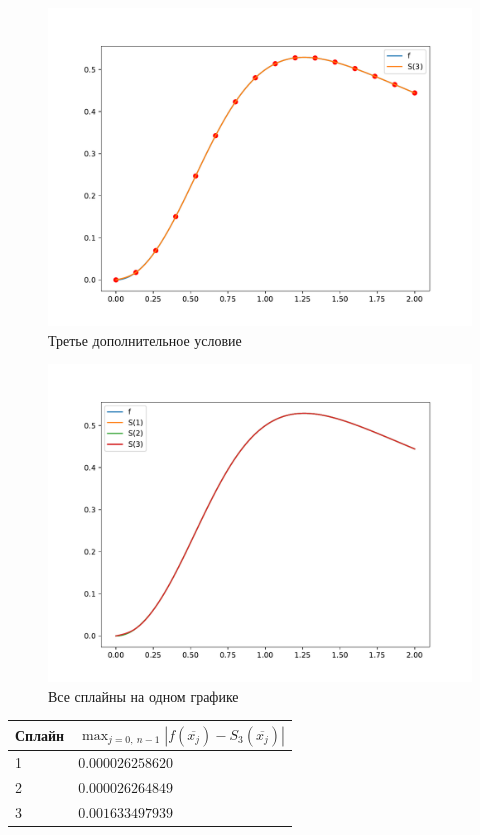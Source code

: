 \documentclass[12pt, a4paper]{article}
\begin{document}
\begin{figure}[H]
	\centering
	\includegraphics[width=\linewidth]{3.pdf}
	\caption{Третье дополнительное условие}
	\label{fig:case_3}
\end{figure}


\begin{figure}[H]
	\centering
	\includegraphics[width=\linewidth]{4.pdf}
	\caption{Все сплайны на одном графике}
	\label{fig:three_cases}
\end{figure}

\begin{table}[H]
	\centering
	\begin{tabular}{|l|l|}
	\hline
		Сплайн	& $\max_{j=0,\ n-1}|f(\overline{x_j}) - S_3(\overline{x_j})|$ \\ \hline
		1   	&     $0.000026258620$	\\ \hline
		2   	&     $0.000026264849$		\\ \hline
		3   	&     $0.001633497939$		\\ \hline
	\end{tabular}
\end{table}
\end{document}

